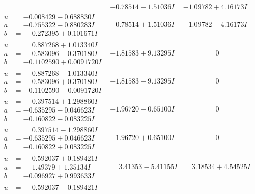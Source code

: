 \documentclass[1p]{elsarticle_modified}
\theoremstyle{definition}
\begin{document}
$$\begin{array}{c|c|c}
 & -0.78514 - 1.51036 I & -1.09782 + 4.16173 I \\ \hline\begin{aligned}
u &= -0.008429 - 0.688830 I \\
a &= -0.755322 - 0.880283 I \\
b &= \phantom{-}0.272395 + 0.101671 I\end{aligned}
 & -0.78514 + 1.51036 I & -1.09782 - 4.16173 I \\ \hline\begin{aligned}
u &= \phantom{-}0.887268 + 1.013340 I \\
a &= \phantom{-}0.583096 - 0.370180 I \\
b &= -0.1102590 + 0.0091720 I\end{aligned}
 & -1.81583 + 9.13295 I & \phantom{-0.000000 } 0 \\ \hline\begin{aligned}
u &= \phantom{-}0.887268 - 1.013340 I \\
a &= \phantom{-}0.583096 + 0.370180 I \\
b &= -0.1102590 - 0.0091720 I\end{aligned}
 & -1.81583 - 9.13295 I & \phantom{-0.000000 } 0 \\ \hline\begin{aligned}
u &= \phantom{-}0.397514 + 1.298860 I \\
a &= -0.635295 - 0.046623 I \\
b &= -0.160822 - 0.083225 I\end{aligned}
 & -1.96720 - 0.65100 I & \phantom{-0.000000 } 0 \\ \hline\begin{aligned}
u &= \phantom{-}0.397514 - 1.298860 I \\
a &= -0.635295 + 0.046623 I \\
b &= -0.160822 + 0.083225 I\end{aligned}
 & -1.96720 + 0.65100 I & \phantom{-0.000000 } 0 \\ \hline\begin{aligned}
u &= \phantom{-}0.592037 + 0.189421 I \\
a &= \phantom{-}1.49379 + 1.35134 I \\
b &= -0.096927 + 0.993633 I\end{aligned}
 & \phantom{-}3.41353 - 5.41155 I & \phantom{-}3.18534 + 4.54525 I \\ \hline\begin{aligned}
u &= \phantom{-}0.592037 - 0.189421 I \\

\end{aligned}
\end{array}$$
\end{document}
